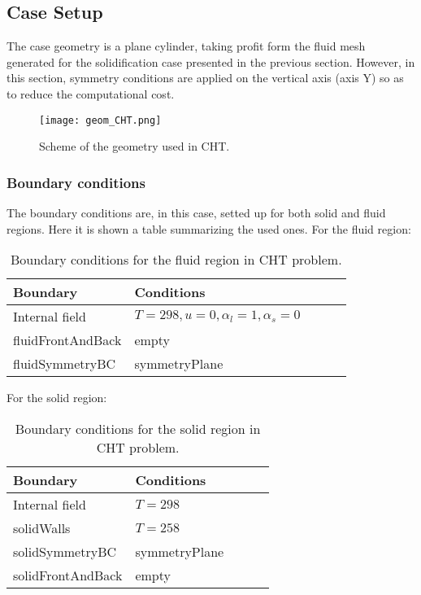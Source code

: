 \subsection{Case Setup}

\setlength{\parindent}{0.5cm} The case geometry is a plane cylinder, taking profit form the fluid mesh generated for the solidification case presented in the previous section. However, in this section, symmetry conditions are applied on the vertical axis (axis Y) so as to reduce the computational cost. 
\clearpage
\begin{figure}[h!]
	\centering
	\texttt{[image: geom\_CHT.png]}	
	\label{4.4fig}
	\caption{Scheme of the geometry used in CHT.}
\end{figure}
\subsubsection{Boundary conditions}

\setlength{\parindent}{0.5cm} The boundary conditions are, in this case, setted up for both solid and fluid regions. Here it is shown a table summarizing the used ones.
\newline
For the fluid region:
\begin{table}[h!]
	\begin{tabular}{@{}lllll@{}}
		\toprule[1pt]
		\textbf{Boundary} & \textbf{Conditions}  \\ \midrule[2pt]
		Internal field & $ T = 298, u = 0, \alpha_{l} = 1, \alpha_{s} = 0    $  \\
		fluidFrontAndBack & empty \\
		fluidSymmetryBC & symmetryPlane \\ \bottomrule[1pt]		
	\end{tabular}
	\centering
	\caption{Boundary conditions for the fluid region in CHT problem.}	
	\label{4.1tab}
\end{table}
For the solid region:
\begin{table}[h!]
	\begin{tabular}{@{}lllll@{}}
		\toprule[1pt]
		\textbf{Boundary} & \textbf{Conditions}  \\ \midrule[2pt]
		Internal field & $ T = 298$\\
		solidWalls & $T = 258$ \\
		solidSymmetryBC & symmetryPlane \\
		solidFrontAndBack & empty \\ \bottomrule[1pt]		
	\end{tabular}
	\centering
	\caption{Boundary conditions for the solid region in CHT problem.}	
	\label{4.2tab}
\end{table}

